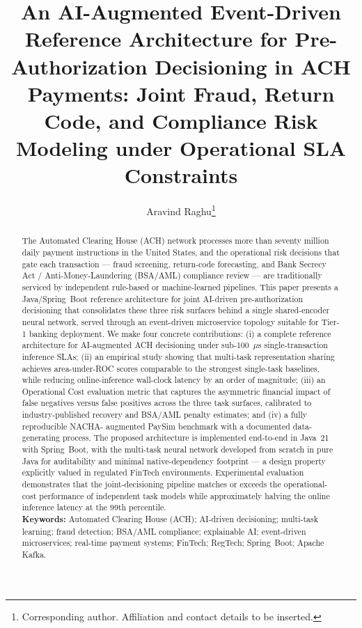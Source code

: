 \documentclass[11pt,a4paper]{article}
\title{\textbf{An AI-Augmented Event-Driven Reference Architecture for Pre-Authorization Decisioning in ACH Payments: Joint Fraud, Return Code, and Compliance Risk Modeling under Operational SLA Constraints}}
\author{Aravind Raghu\thanks{Corresponding author. Affiliation and contact details to be inserted.}}
\date{}
\begin{document}
\maketitle

\begin{abstract}
The Automated Clearing House (ACH) network processes more than seventy
million daily payment instructions in the United States, and the operational
risk decisions that gate each transaction --- fraud screening, return-code
forecasting, and Bank Secrecy Act / Anti-Money-Laundering (BSA/AML)
compliance review --- are traditionally serviced by independent rule-based or
machine-learned pipelines. This paper presents a Java/Spring~Boot reference
architecture for joint AI-driven pre-authorization decisioning that consolidates
these three risk surfaces behind a single shared-encoder neural network, served
through an event-driven microservice topology suitable for Tier-1 banking
deployment. We make four concrete contributions: (i) a complete reference
architecture for AI-augmented ACH decisioning under sub-100~$\mu$s
single-transaction inference SLAs; (ii) an empirical study showing that
multi-task representation sharing achieves area-under-ROC scores comparable to
the strongest single-task baselines, while reducing online-inference wall-clock
latency by an order of magnitude; (iii) an Operational Cost evaluation metric
that captures the asymmetric financial impact of false negatives versus false
positives across the three task surfaces, calibrated to industry-published
recovery and BSA/AML penalty estimates; and (iv) a fully reproducible NACHA-
augmented PaySim benchmark with a documented data-generating process. The
proposed architecture is implemented end-to-end in Java~21 with Spring~Boot,
with the multi-task neural network developed from scratch in pure Java for
auditability and minimal native-dependency footprint --- a design property
explicitly valued in regulated FinTech environments. Experimental evaluation
demonstrates that the joint-decisioning pipeline matches or exceeds the
operational-cost performance of independent task models while approximately
halving the online inference latency at the 99th percentile.
\\[0.5em]
\textbf{Keywords:} Automated Clearing House (ACH); AI-driven decisioning;
multi-task learning; fraud detection; BSA/AML compliance; explainable AI;
event-driven microservices; real-time payment systems; FinTech; RegTech;
Spring~Boot; Apache Kafka.
\end{abstract}
\end{document}
